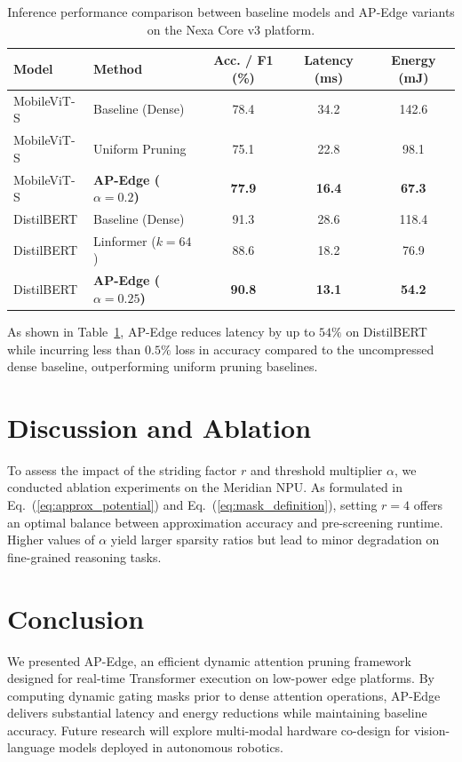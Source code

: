 \documentclass[runningheads]{llncs}
\begin{document}
\begin{table}[ht]
\caption{Inference performance comparison between baseline models and AP-Edge variants on the Nexa Core v3 platform.}
\label{tab:performance_comparison}
\centering
\small
\begin{tabular}{@{}llccc@{}}
\toprule
\textbf{Model} & \textbf{Method} & \textbf{Acc. / F1 (\%)} & \textbf{Latency (ms)} & \textbf{Energy (mJ)} \\
\midrule
MobileViT-S & Baseline (Dense) & 78.4 & 34.2 & 142.6 \\{}
MobileViT-S & Uniform Pruning & 75.1 & 22.8 & 98.1 \\{}
MobileViT-S & \textbf{AP-Edge ($\alpha=0.2$)} & \textbf{77.9} & \textbf{16.4} & \textbf{67.3} \\
\midrule
DistilBERT & Baseline (Dense) & 91.3 & 28.6 & 118.4 \\{}
DistilBERT & Linformer ($k=64$) & 88.6 & 18.2 & 76.9 \\{}
DistilBERT & \textbf{AP-Edge ($\alpha=0.25$)} & \textbf{90.8} & \textbf{13.1} & \textbf{54.2} \\
\bottomrule
\end{tabular}
\end{table}

As shown in Table~\ref{tab:performance_comparison}, AP-Edge reduces latency by up to $54\%$ on DistilBERT while incurring less than $0.5\%$ loss in accuracy compared to the uncompressed dense baseline, outperforming uniform pruning baselines.

\section{Discussion and Ablation}
To assess the impact of the striding factor $r$ and threshold multiplier $\alpha$, we conducted ablation experiments on the Meridian NPU. As formulated in Eq.~(\ref{eq:approx_potential}) and Eq.~(\ref{eq:mask_definition}), setting $r = 4$ offers an optimal balance between approximation accuracy and pre-screening runtime. Higher values of $\alpha$ yield larger sparsity ratios but lead to minor degradation on fine-grained reasoning tasks.

\section{Conclusion}
We presented AP-Edge, an efficient dynamic attention pruning framework designed for real-time Transformer execution on low-power edge platforms. By computing dynamic gating masks prior to dense attention operations, AP-Edge delivers substantial latency and energy reductions while maintaining baseline accuracy. Future research will explore multi-modal hardware co-design for vision-language models deployed in autonomous robotics.
\end{document}
